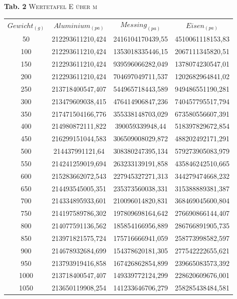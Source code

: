 \documentclass[11pt, a4paper]{article}
\begin{document}
\begin{center}
\textbf{Tab. 2}
\textsc{Wertetafel E über m}\\
\vspace{5mm}
\begin{tabular}{cccc}
$Gewicht_{(g)}$ & $Aluminium_{(pa)}$ & $Messing_{(pa)}$ & $Eisen_{(pa)}$\\
50 & 212293611210,424	& 2416104170439,55	& 4510061118153,83\\
100 & 212293611210,424	& 1353018335446,15	& 2067111345820,51\\
150 & 212293611210,424	& 939596066282,049	& 1378074230547,01\\
200 & 212293611210,424	& 704697049711,537	& 1202682964841,02\\
250 & 213718400547,407	& 544965718443,589	& 949486551190,281\\
300 & 213479609038,415	& 476414906847,236	& 740457795517,794\\
350 & 217471504166,776	& 355338148703,029	& 673580556607,391\\
400 & 214980872111,822	& 390059339948,44	& 518397829672,854\\
450 & 216299151044,583	& 306509008029,872	& 488202492171,291\\
500 & 214437991121,64	& 308380247395,134	& 579273905083,979\\
550 & 214241259019,694	& 263233139191,858	& 435846242510,665\\
600 & 215283662072,543	& 227945327271,313	& 344279474668,232\\
650 & 214493545005,351	& 235373560038,331	& 315388889381,387\\
700 & 214334895933,601	& 210096014820,831	& 368469045600,804\\
750 & 214197589786,302	& 197809698164,642	& 276690866144,407\\
800 & 214077591136,562	& 185854166956,889	& 286766891905,735\\
850 & 213971821575,724	& 175716666941,059	& 258773998582,597\\
900 & 214678932684,699	& 154378620181,305	& 277542222655,621\\
950 & 213793919416,858	& 167426862854,899	& 239665083573,392\\
1000 & 213718400547,407	& 149339772124,299	& 228620609676,001\\
1050 & 213650119908,254	& 141233646706,279	& 258285438484,581\\
\end{tabular}\newpage
\end{center}
\end{document}
